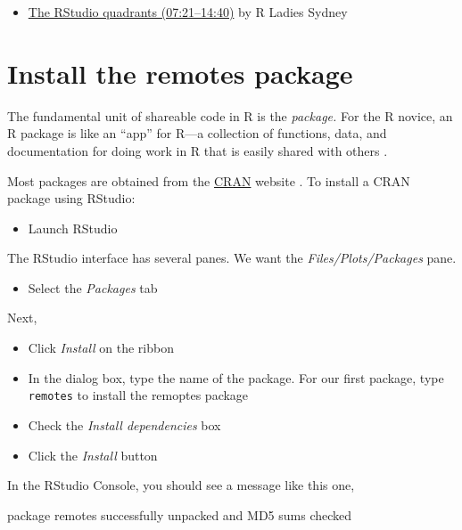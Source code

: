 \documentclass[
]{book}
\newenvironment{Shaded}{\begin{snugshade}}{\end{snugshade}}
\newcommand{\NormalTok}[1]{#1}
\newcommand{\StringTok}[1]{\textcolor[rgb]{0.31,0.60,0.02}{#1}}
\providecommand{\tightlist}{%
  \setlength{\itemsep}{0pt}\setlength{\parskip}{0pt}}
\begin{document}
\begin{itemize}
\tightlist
\item
  \href{https://www.youtube.com/embed/kfcX5DEMAp4?start=441\&end=880}{The RStudio quadrants (07:21--14:40)} by R Ladies Sydney \citep{RLadiesSydney:2018:Lesson1}
\end{itemize}

\hypertarget{install-the-remotes-package}{%
\section*{Install the remotes package}\label{install-the-remotes-package}}

The fundamental unit of shareable code in R is the \emph{package.} For the R novice, an R package is like an ``app'' for R---a collection of functions, data, and documentation for doing work in R that is easily shared with others \citep{wickham2014advanced}.

Most packages are obtained from the \href{https://cran.r-project.org/}{CRAN} website \citep{cranweb}. To install a CRAN package using RStudio:

\begin{itemize}
\tightlist
\item
  Launch RStudio
\end{itemize}

The RStudio interface has several panes. We want the \emph{Files/Plots/Packages} pane.

\begin{itemize}
\tightlist
\item
  Select the \emph{Packages} tab
\end{itemize}

Next,

\begin{itemize}
\tightlist
\item
  Click \emph{Install} on the ribbon
\item
  In the dialog box, type the name of the package. For our first package, type \texttt{remotes} to install the remoptes package \citep{R-remotes}
\item
  Check the \emph{Install dependencies} box
\item
  Click the \emph{Install} button
\end{itemize}

In the RStudio Console, you should see a message like this one,

\begin{Shaded}
\begin{Highlighting}[]
\NormalTok{    package }\StringTok{\textquotesingle{}remotes\textquotesingle{}}\NormalTok{ successfully unpacked and MD5 sums checked}
\end{Highlighting}
\end{Shaded}
\end{document}
